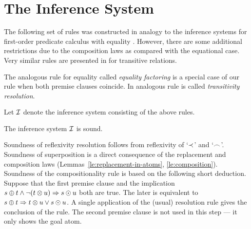 \section{The Inference System} \label{se:reasoning}

The following set of rules was constructed in analogy to the inference
systems for first-order predicate calculus with equality \cite{BG,S-A}.
However, there are some additional restrictions due to the composition laws
as compared with the equational case.
Very similar rules are presented in \cite{BG249} for transitive relations.
 



The analogous rule for equality called {\em equality factoring} \cite{BG,S-A}
is a special case of our rule when both premise clauses coincide. In 
\cite{BG249} analogous rule is called {\em transitivity resolution}.

Let $\mbox{$\cal I$}$ denote the inference system consisting of the above rules. 
\begin{THEOREM} \label{th:soundness}
The inference system $\mbox{$\cal I$}$ is sound.
\end{THEOREM}
\begin{PROOF}
Soundness of reflexivity resolution follows from reflexivity of
 `$\mathbin{\prec}$' and `$\mathbin{\frown}$'. 
Soundness of superposition is a direct consequence of the replacement
and composition laws (Lemmas~\ref{le:replacement-in-atoms}, \ref{le:composition}).
Soundness of the
compositionality
rule is based on the following short deduction. Suppose that the first premise 
clause and the implication
\(s\oplus t \land \neg(t\otimes u)\mathrel\Rightarrow s\odot u\)
both are true. The later is equivalent to
\(s\oplus t \mathrel\Rightarrow t\otimes u \lor s\odot u \).
A single application of the (usual) resolution rule gives the conclusion of the 
rule. The second premise clause is not used in this step --- it only shows the
goal atom.

\end{PROOF}

